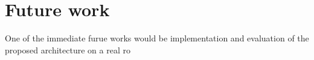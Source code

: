 \section{Future work}
One of the immediate furue works would be implementation and evaluation of the proposed architecture on a real ro